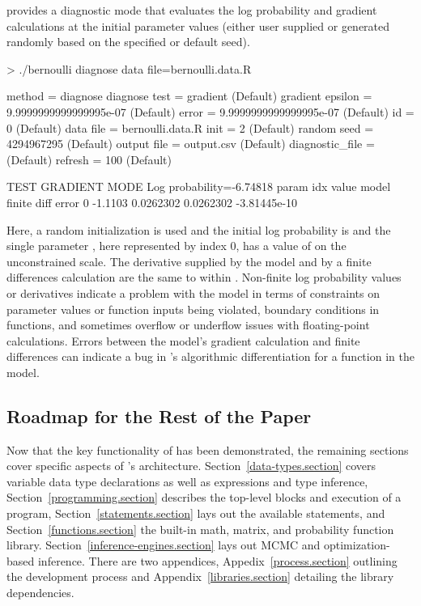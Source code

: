 \documentclass[article]{jss}
\begin{document}
 provides a diagnostic mode that evaluates the log
probability and gradient calculations at the initial parameter values
(either user supplied or generated randomly based on the specified
or default seed).
%
\begin{CodeChunk}
\begin{CodeInput}
> ./bernoulli diagnose data file=bernoulli.data.R 
\end{CodeInput}
\begin{CodeOutput}
 method = diagnose
   diagnose
     test = gradient (Default)
       gradient
         epsilon = 9.9999999999999995e-07 (Default)
         error = 9.9999999999999995e-07 (Default)
 id = 0 (Default)
 data
   file = bernoulli.data.R
 init = 2 (Default)
 random
   seed = 4294967295 (Default)
 output
   file = output.csv (Default)
   diagnostic_file =  (Default)
   refresh = 100 (Default)

TEST GRADIENT MODE
 Log probability=-6.74818
 param idx           value           model     finite diff           error
         0         -1.1103       0.0262302       0.0262302    -3.81445e-10
\end{CodeOutput}
\end{CodeChunk}
%
Here, a random initialization is used and the initial log probability
is  and the single parameter , here
represented by index 0, has a value of  on the
unconstrained scale.  The derivative supplied by the model and by a
finite differences calculation are the same to within
.  Non-finite log probability values or derivatives
indicate a problem with the model in terms of constraints on parameter
values or function inputs being violated, boundary conditions in
functions, and sometimes overflow or underflow issues with
floating-point calculations.  Errors between the model's gradient
calculation and finite differences can indicate a bug in
's algorithmic differentiation for a function in the model.

\subsection{Roadmap for the Rest of the Paper}

Now that the key functionality of  has been
demonstrated, the remaining sections cover specific aspects of
's architecture.  Section~\ref{data-types.section}
covers variable data type declarations as well as expressions and type
inference, Section~\ref{programming.section} describes the top-level
blocks and execution of a  program,
Section~\ref{statements.section} lays out the available statements,
and Section~\ref{functions.section} the built-in math, matrix, and
probability function library.  Section~\ref{inference-engines.section}
lays out MCMC and optimization-based inference.  There are two
appendices, Appedix~\ref{process.section} outlining the development
process and Appendix~\ref{libraries.section} detailing the library
dependencies.
\end{document}

